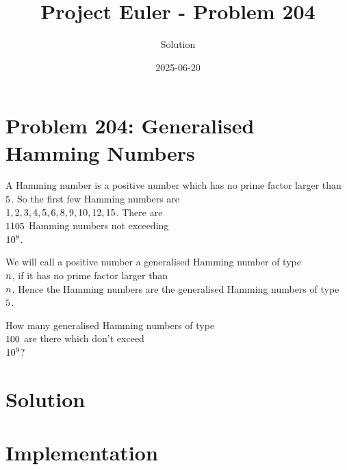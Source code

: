 \documentclass{article}
\title{Project Euler - Problem 204}
\author{Solution}
\date{2025-06-20}
\begin{document}
\maketitle

\section*{Problem 204: Generalised Hamming Numbers}


A Hamming number is a positive number which has no prime factor larger than \\$5\\$.
So the first few Hamming numbers are \\$1, 2, 3, 4, 5, 6, 8, 9, 10, 12, 15\\$.
There are \\$1105\\$ Hamming numbers not exceeding \\$10\\^8\\$.

\par
We will call a positive number a generalised Hamming number of type \\$n\\$, if it has no prime factor larger than \\$n\\$.
Hence the Hamming numbers are the generalised Hamming numbers of type \\$5\\$.

\par
How many generalised Hamming numbers of type \\$100\\$ are there which don't exceed \\$10\\^9\\$?

\par


\section*{Solution}


\section*{Implementation}

\end{document}
